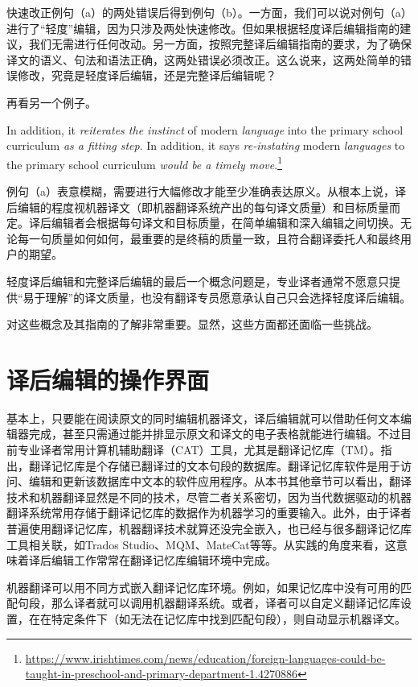 \documentclass[output=paper,colorlinks,citecolor=brown]{langscibook}
\begin{document}
快速改正例句（a）的两处错误后得到例句（b）。一方面，我们可以说对例句（a）进行了“轻度”编辑，因为只涉及两处快速修改。但如果根据轻度译后编辑指南的建议，我们无需进行任何改动。另一方面，按照完整译后编辑指南的要求，为了确保译文的语义、句法和语法正确，这两处错误必须改正。这么说来，这两处简单的错误修改，究竟是轻度译后编辑，还是完整译后编辑呢？

再看另一个例子。

\ea
\ea In addition, it \textit{reiterates the instinct} of modern \textit{language} into the primary school curriculum \textit{as a fitting step}.
\ex In addition, it says \textit{re-instating} modern \textit{languages} to the primary school curriculum \textit{would be a timely move}.\footnote{\url{https://www.irishtimes.com/news/education/foreign-languages-could-be-taught-in-preschool-and-primary-department-1.4270886}}
\z
\z

例句（a）表意模糊，需要进行大幅修改才能至少准确表达原义。从根本上说，译后编辑的程度视机器译文（即机器翻译系统产出的每句译文质量）和目标质量而定。译后编辑者会根据每句译文和目标质量，在简单编辑和深入编辑之间切换。无论每一句质量如何如何，最重要的是终稿的质量一致，且符合翻译委托人和最终用户的期望。

轻度译后编辑和完整译后编辑的最后一个概念问题是，专业译者通常不愿意只提供“易于理解”的译文质量，也没有翻译专员愿意承认自己只会选择轻度译后编辑。

对这些概念及其指南的了解非常重要。显然，这些方面都还面临一些挑战。

\section{译后编辑的操作界面}\label{sec:obrien:3}

基本上，只要能在阅读原文的同时编辑机器译文，译后编辑就可以借助任何文本编辑器完成，甚至只需通过能并排显示原文和译文的电子表格就能进行编辑。不过目前专业译者常用计算机辅助翻译（CAT）工具，尤其是翻译记忆库（TM）。指出，翻译记忆库是个存储已翻译过的文本句段的数据库。翻译记忆库软件是用于访问、编辑和更新该数据库中文本的软件应用程序。从本书其他章节可以看出，翻译技术和机器翻译显然是不同的技术，尽管二者关系密切，因为当代数据驱动的机器翻译系统常用存储于翻译记忆库的数据作为机器学习的重要输入。此外，由于译者普遍使用翻译记忆库，机器翻译技术就算还没完全嵌入，也已经与很多翻译记忆库工具相关联，如Trados Studio、MQM、MateCat等等。从实践的角度来看，这意味着译后编辑工作常常在翻译记忆库编辑环境中完成。

机器翻译可以用不同方式嵌入翻译记忆库环境。例如，如果记忆库中没有可用的匹配句段，那么译者就可以调用机器翻译系统。或者，译者可以自定义翻译记忆库设置，在在特定条件下（如无法在记忆库中找到匹配句段），则自动显示机器译文。
\end{document}
